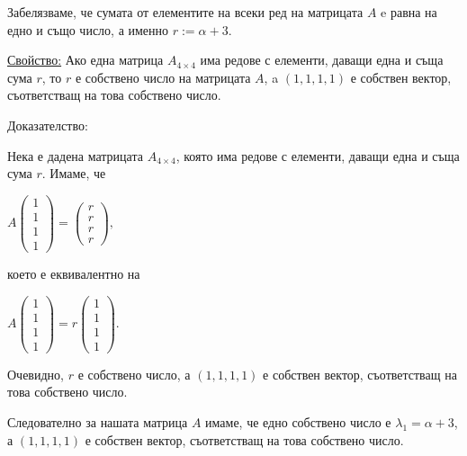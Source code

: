\documentclass{article}
\begin{document}
\justify
Забелязваме, че сумата от елементите на всеки ред на матрицата $A$ e равна на едно и също число, а именно $r := \alpha + 3$. 

\justify
\underline{Свойство:} Ако една матрица $A_{4\times4}$ има редове с елементи, даващи една и съща сума $r$, то $r$ е собствено число на матрицата $A$, a $(1,1,1,1)$ е собствен вектор, съответстващ на това собствено число.

\justify
Доказателство:

\justify
Нека е дадена матрицата $A_{4\times4}$, която има редове с елементи, даващи една и съща сума $r$. Имаме, че

\begin{center}
    $A\begin{pmatrix}
         1 \\
         1 \\
         1 \\
         1
         \end{pmatrix} = \begin{pmatrix}
         r \\
         r \\
         r \\
         r
         \end{pmatrix},$
\end{center}

\justify
което е еквивалентно на 

\begin{center}
    $A\begin{pmatrix}
         1 \\
         1 \\
         1 \\
         1
         \end{pmatrix} = r\begin{pmatrix}
         1 \\
         1 \\
         1 \\
         1
         \end{pmatrix}.$
\end{center}

\justify
Очевидно, $r$ е собствено число, а $(1,1,1,1)$ е собствен вектор, съответстващ на това собствено число.

\justify
Следователно за нашата матрица $A$ имаме, че едно собствено число е $\lambda_1 = \alpha + 3$, а $(1,1,1,1)$ е собствен вектор, съответстващ на това собствено число. 
\end{document}
